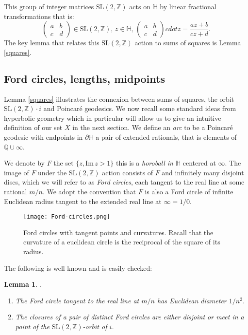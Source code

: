 \documentclass[12pt,a4paper]{amsart}
\newtheorem{lem}[thm]{Lemma}
\def\HH{\mathbb{H}}
\def\im{\mathrm{Im}\,}
\def\ZZ{\mathbb{Z}}
\def\sl2{\mathrm{SL}(2, \ZZ)}
\begin{document}
This group of integer matrices $\sl2$  acts on $\HH$ by linear fractional transformations
that is:
$$\begin{pmatrix}
a & b \\
c & d
\end{pmatrix} \in \sl2,\, z\in \HH,\, 
\begin{pmatrix}
a & b \\
c & d
\end{pmatrix}cdot z = \frac{az + b}{cz + d}.
$$
The key lemma that relates this  $\sl2$ action to sums of squares is Lemma \ref{squares}.
\subsection{Ford circles, lengths, midpoints} 
\label{lengths}
Lemma \ref{squares} illustrates the connexion between sums of squares,
the orbit $\sl2\cdot i$ and Poincaré geodesics. 
We now recall some standard ideas from hyperbolic geometry
which in particular will allow us to give an intuitive definition 
of our set $X$ in the next section.
We define an \textit{arc} to be a Poincaré geodesic
with endpoints in $\partial \mathbb{H}$ a pair of extended rationals, 
that is elements of $\mathbb{Q} \cup \infty$.

We denote by $F$ the set  $\{ z, \im z > 1\}$
this is a \textit{horoball in $\mathbb{H}$} centered at $\infty$.
The image of $F$ under the $\sl2$ action consists of
$F$ and infinitely many disjoint discs, 
which we will refer to as \textit{Ford circles}, 
each tangent to the real line at some rational $m/n$.
We adopt the convention that $F$ is also a Ford circle of infinite
Euclidean radius
tangent to the extended real line at $\infty = 1/0$.


\begin{figure}[ht]

	\begin{center} \texttt{[image: Ford-circles.png]}
	\end{center}

\caption{Ford circles with tangent points and curvatures. Recall
that the curvature of a euclidean circle is the reciprocal of the
square of its radius.}%
\end{figure}


The following is well known and is easily checked:

\begin{lem}\label{ford}.

\begin{enumerate}
\item The Ford circle tangent to the real line at $m/n$
has Euclidean diameter $1/n^2$.

\item The closures of a  pair of distinct Ford circles are either disjoint or meet in a 
point of the $\sl2$-orbit of $i$.
\end{enumerate}
\end{lem}
\end{document}
